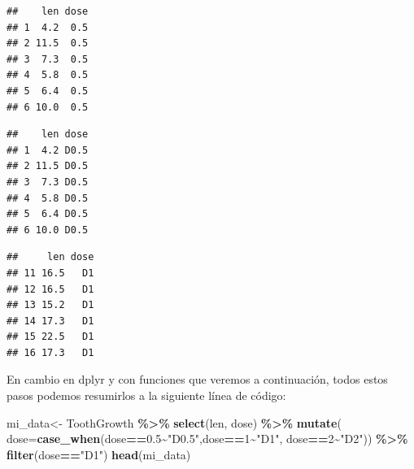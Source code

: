 \documentclass[
]{book}
\newenvironment{Shaded}{\begin{snugshade}}{\end{snugshade}}
\newcommand{\AttributeTok}[1]{\textcolor[rgb]{0.13,0.29,0.53}{#1}}
\newcommand{\CommentTok}[1]{\textcolor[rgb]{0.56,0.35,0.01}{\textit{#1}}}
\newcommand{\DecValTok}[1]{\textcolor[rgb]{0.00,0.00,0.81}{#1}}
\newcommand{\FloatTok}[1]{\textcolor[rgb]{0.00,0.00,0.81}{#1}}
\newcommand{\FunctionTok}[1]{\textcolor[rgb]{0.13,0.29,0.53}{\textbf{#1}}}
\newcommand{\NormalTok}[1]{#1}
\newcommand{\OtherTok}[1]{\textcolor[rgb]{0.56,0.35,0.01}{#1}}
\newcommand{\SpecialCharTok}[1]{\textcolor[rgb]{0.81,0.36,0.00}{\textbf{#1}}}
\newcommand{\StringTok}[1]{\textcolor[rgb]{0.31,0.60,0.02}{#1}}
\begin{document}
\begin{verbatim}
##    len dose
## 1  4.2  0.5
## 2 11.5  0.5
## 3  7.3  0.5
## 4  5.8  0.5
## 5  6.4  0.5
## 6 10.0  0.5
\end{verbatim}

\begin{Shaded}
\end{Shaded}

\begin{verbatim}
##    len dose
## 1  4.2 D0.5
## 2 11.5 D0.5
## 3  7.3 D0.5
## 4  5.8 D0.5
## 5  6.4 D0.5
## 6 10.0 D0.5
\end{verbatim}

\begin{Shaded}
\end{Shaded}

\begin{verbatim}
##     len dose
## 11 16.5   D1
## 12 16.5   D1
## 13 15.2   D1
## 14 17.3   D1
## 15 22.5   D1
## 16 17.3   D1
\end{verbatim}

\hfill\break
En cambio en dplyr y con funciones que veremos a continuación, todos estos pasos podemos resumirlos a la siguiente línea de código:\\

\begin{Shaded}
\begin{Highlighting}[]
\NormalTok{mi\_data}\OtherTok{\textless{}{-}}\NormalTok{ ToothGrowth }\SpecialCharTok{\%\textgreater{}\%} \FunctionTok{select}\NormalTok{(len, dose) }\SpecialCharTok{\%\textgreater{}\%} \FunctionTok{mutate}\NormalTok{(}
  \AttributeTok{dose=}\FunctionTok{case\_when}\NormalTok{(dose}\SpecialCharTok{==}\FloatTok{0.5}\SpecialCharTok{\textasciitilde{}}\StringTok{"D0.5"}\NormalTok{,dose}\SpecialCharTok{==}\DecValTok{1}\SpecialCharTok{\textasciitilde{}}\StringTok{"D1"}\NormalTok{, dose}\SpecialCharTok{==}\DecValTok{2}\SpecialCharTok{\textasciitilde{}}\StringTok{"D2"}\NormalTok{)) }\SpecialCharTok{\%\textgreater{}\%} \FunctionTok{filter}\NormalTok{(dose}\SpecialCharTok{==}\StringTok{"D1"}\NormalTok{)}
\FunctionTok{head}\NormalTok{(mi\_data)}
\end{Highlighting}
\end{Shaded}
\end{document}
